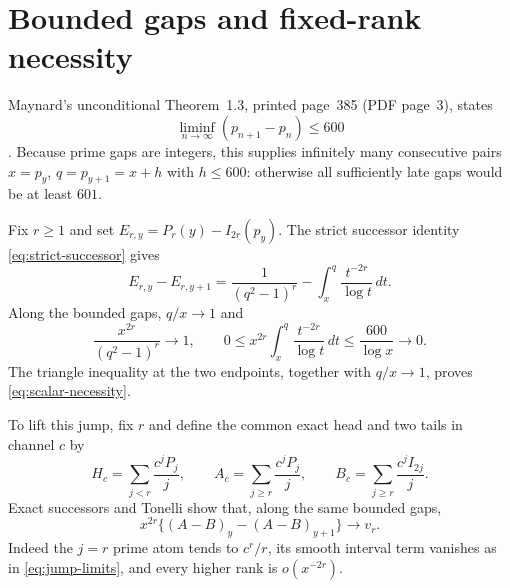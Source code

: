 \documentclass[11pt]{article}
\theoremstyle{definition}
\theoremstyle{remark}
\begin{document}
\section{Bounded gaps and fixed-rank necessity}

Maynard's unconditional Theorem~1.3, printed page~385 (PDF page~3),
states
\begin{equation}
 \liminf_{n\to\infty}(p_{n+1}-p_n)\le600
 \label{eq:Maynard}
\end{equation}
\cite{Maynard2015}.  Because prime gaps are integers, this supplies
infinitely many consecutive pairs $x=p_y$, $q=p_{y+1}=x+h$ with
$h\le600$: otherwise all sufficiently late gaps would be at least $601$.

Fix $r\ge1$ and set $E_{r,y}=P_r(y)-I_{2r}(p_y)$.  The strict successor
identity \eqref{eq:strict-successor} gives
\begin{equation}
 E_{r,y}-E_{r,y+1}
 =\frac1{(q^2-1)^r}-\int_x^q\frac{t^{-2r}}{\log t}\,dt.
 \label{eq:scalar-jump}
\end{equation}
Along the bounded gaps, $q/x\to1$ and
\begin{equation}
 \frac{x^{2r}}{(q^2-1)^r}\longrightarrow1,\qquad
 0\le x^{2r}\int_x^q\frac{t^{-2r}}{\log t}\,dt
 \le\frac{600}{\log x}\longrightarrow0.
 \label{eq:jump-limits}
\end{equation}
The triangle inequality at the two endpoints, together with $q/x\to1$,
proves \eqref{eq:scalar-necessity}.

To lift this jump, fix $r$ and define the common exact head and two tails
in channel $c$ by
\begin{equation}
 H_c=\sum_{j<r}\frac{c^jP_j}{j},\qquad
 A_c=\sum_{j\ge r}\frac{c^jP_j}{j},\qquad
 B_c=\sum_{j\ge r}\frac{c^jI_{2j}}j.
 \label{eq:common-head}
\end{equation}
Exact successors and Tonelli show that, along the same bounded gaps,
\begin{equation}
 x^{2r}\{(A-B)_y-(A-B)_{y+1}\}\longrightarrow v_r.
 \label{eq:vector-jump}
\end{equation}
Indeed the $j=r$ prime atom tends to $c^r/r$, its smooth interval term
vanishes as in \eqref{eq:jump-limits}, and every higher rank is
$o(x^{-2r})$.
\end{document}

